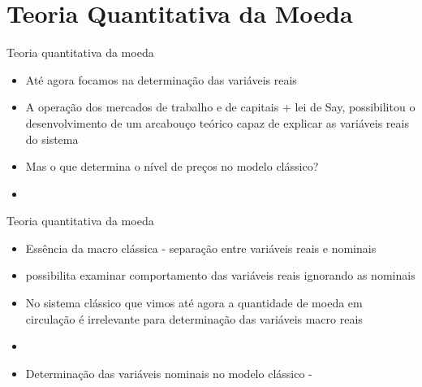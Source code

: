 \documentclass[10pt]{beamer}
\begin{document}
\section{Teoria Quantitativa da Moeda}
\begin{frame}
    {Teoria quantitativa da moeda}
    \begin{itemize}
        \item Até agora focamos na determinação das variáveis reais\bigskip
        \item A operação dos mercados de trabalho e de capitais + lei de Say, possibilitou o desenvolvimento de um arcabouço teórico capaz de explicar as variáveis reais do sistema\bigskip
        \item Mas o que determina o nível de preços no modelo clássico?\bigskip
        \item {}
    \end{itemize}
\end{frame}

\begin{frame}
    {Teoria quantitativa da moeda}
    \begin{itemize}
        \item Essência da macro clássica - separação entre variáveis reais e nominais\bigskip
        \item {} possibilita examinar comportamento das variáveis reais ignorando as nominais\bigskip
        \item No sistema clássico que vimos até agora a quantidade de moeda em circulação é irrelevante para determinação das variáveis macro reais\bigskip
        \item {}\bigskip
        \item Determinação das variáveis nominais no modelo clássico - 
    \end{itemize}
\end{frame}
\end{document}
